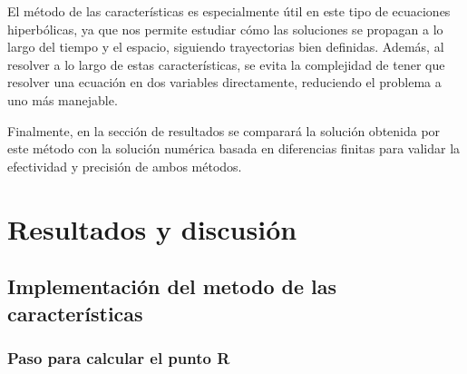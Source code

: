 El método de las características es especialmente útil en este tipo de ecuaciones hiperbólicas, ya que nos permite estudiar cómo las soluciones se propagan a lo largo del tiempo y el espacio, siguiendo trayectorias bien definidas. Además, al resolver a lo largo de estas características, se evita la complejidad de tener que resolver una ecuación en dos variables directamente, reduciendo el problema a uno más manejable.

Finalmente, en la sección de resultados se comparará la solución obtenida por este método con la solución numérica basada en diferencias finitas para validar la efectividad y precisión de ambos métodos.


\chapter{Resultados y discusión}

\section{Implementación del metodo de las características}

\subsection{Paso para calcular el punto R}

